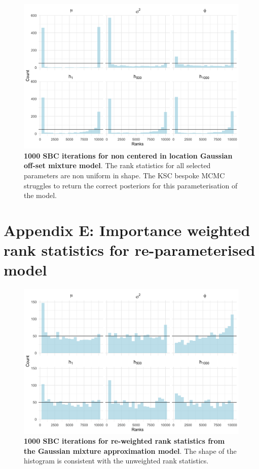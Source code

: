 \documentclass[12pt, a4paper]{article}
\begin{document}
    \begin{figure}[H]
        \centering
        \includegraphics[scale=0.09]{results/ksc_ncp_1k.png}
        \caption{\textbf{1000 SBC iterations for non centered in location Gaussian off-set mixture model}. The rank statistics for all selected parameters are non uniform in shape. The KSC bespoke MCMC struggles to return the correct posteriors for this parameterisation of the model.}
        \label{fig:ncpksc1k}
    \end{figure}
    
\section{Appendix E: Importance weighted rank statistics for re-parameterised model}

\begin{figure}[H]
        \centering
        \includegraphics[scale=0.09]{results/weighted_ksc_cp_1k.png}
        \caption{\textbf{1000 SBC iterations for re-weighted rank statistics from the Gaussian mixture approximation model}. The shape of the histogram is consistent with the unweighted rank statistics.}
        \label{fig:reweight1k}
    \end{figure}
\end{document}
